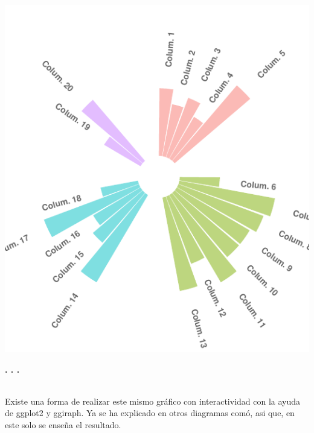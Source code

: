 \documentclass{article}\usepackage[]{graphicx}\usepackage[]{color}
\makeatletter
\def\maxwidth{ %
  \ifdim\Gin@nat@width>\linewidth
    \linewidth
  \else
    \Gin@nat@width
  \fi
}
\newenvironment{knitrout}{}{} %
\makeatother
\begin{document}
\begin{knitrout}
\color{fgcolor}

{\centering \includegraphics[width=\maxwidth]{figure/plot_ggplot_final_cr-1} 

}



\end{knitrout}
\begin{center}
\textbf{. . .}
\end{center}
~\\
Existe una forma de realizar este mismo gr\'afico con interactividad con la ayuda de ggplot2 y ggiraph. Ya se ha explicado en otros diagramas com\'o, asi que, en este solo se ense\~na el resultado.
\end{document}
